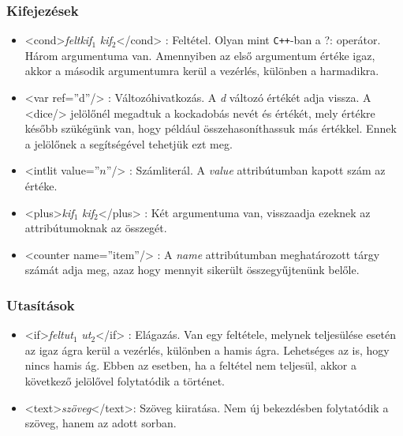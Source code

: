 \documentclass[12pt,a4paper,oneside]{report}
\newcommand{\xtag}[1]{{\color{Tag}#1}}
\newcommand{\xattr}[2]{{\color{Attr}#1}={\color{Value}''#2''}}
\newcommand{\attr}{\emph}
\newcommand{\proglang}{\texttt}
\newcommand{\kif}{\emph{kif}}
\newcommand{\felt}{\emph{felt}}
\newcommand{\ut}{\emph{ut}}
\begin{document}
      \subsubsection{Kifejezések}
        \begin{itemize}
          \item <\xtag{cond}>\felt \kif$_1$ \kif$_2$<\xtag{/cond}> :
            Feltétel. Olyan mint \proglang{C++}-ban a ?: operátor. Három
            argumentuma van. Amennyiben az első argumentum értéke igaz,
            akkor a második argumentumra kerül a vezérlés, különben a
            harmadikra.
          \item <\xtag{var} \xattr{ref}{d}/>
            : Változóhivatkozás. A \emph{d} változó értékét adja
            vissza. A <\xtag{dice}/> jelölőnél megadtuk a kockadobás nevét és
            értékét, mely értékre később szükégünk van, hogy például
            összehasoníthassuk más értékkel. Ennek a jelölőnek a
            segítségével tehetjük ezt meg.
            
          \item <\xtag{intlit} \xattr{value}{$n$}/>
            : Számliterál. A
            \attr{value} attribútumban kapott szám az értéke.
    
          \item <\xtag{plus}>\kif$_1$ \kif$_2$<\xtag{/plus}> : Két argumentuma
            van, visszaadja ezeknek az attribútumoknak az összegét.

          \item <\xtag{counter}
            {\color{Attr}name}={\color{Value}''item''}/> : A \attr{name}
            attribútumban meghatározott tárgy számát adja meg, azaz hogy
            mennyit sikerült összegyűjtenünk belőle.
            
        \end{itemize}

      \subsubsection{Utasítások}
        \begin{itemize}
          \item <\xtag{if}>\felt \ut$_1$ \ut$_2$<\xtag{/if}> : Elágazás. Van egy
            feltétele, melynek teljesülése esetén az igaz ágra kerül a
            vezérlés, különben a hamis ágra. Lehetséges az is, hogy nincs
            hamis ág. Ebben az esetben, ha a feltétel nem teljesül, akkor
            a következő jelölővel folytatódik a történet.

          \item <\xtag{text}>\emph{szöveg}<\xtag{/text}>: Szöveg
            kiiratása. Nem új bekezdésben folytatódik a szöveg, hanem az
            adott sorban.
      \end{itemize}
\end{document}
